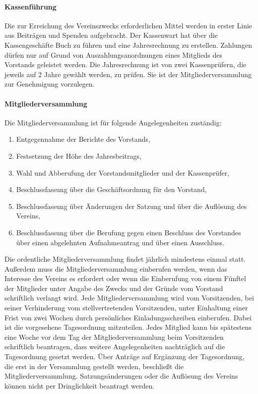 \begin{multicols}{2}
\paragraph{Kassenführung}
Die zur Erreichung des Vereinszwecks erforderlichen Mittel werden in
erster Linie aus Beiträgen und Spenden aufgebracht. Der Kassenwart hat
über die Kassengeschäfte Buch zu führen und eine Jahresrechnung zu
erstellen. Zahlungen dürfen nur auf Grund von Auszahlungsanordnungen
eines Mitglieds des Vorstands geleistet werden. Die Jahresrechnung ist von
zwei Kassenprüfern, die jeweils auf 2 Jahre gewählt werden, zu prüfen. Sie
ist der Mitgliederversammlung zur Genehmigung vorzulegen.

\paragraph{Mitgliederversammlung}
Die Mitgliederversammlung ist für folgende Angelegenheiten zuständig:
\begin{enumerate}
\item Entgegennahme der Berichte des Vorstands,
\item Festsetzung der Höhe des Jahresbeitrags,
\item Wahl und Abberufung der Vorstandsmitglieder und der Kassenprüfer,
\item Beschlussfassung über die Geschäftsordnung für den Vorstand,
\item Beschlussfassung über Änderungen der Satzung und über die Auflösung
des Vereins,
\item Beschlussfassung über die Berufung gegen einen Beschluss des
Vorstandes über einen abgelehnten Aufnahmeantrag und über einen
Ausschluss.
\end{enumerate}
Die ordentliche Mitgliederversammlung findet jährlich mindestens einmal
statt. Außerdem muss die Mitgliederversammlung einberufen werden, wenn
das Interesse des Vereins es erfordert oder wenn die Einberufung von
einem Fünftel der Mitglieder unter Angabe des Zwecks und der Gründe
vom Vorstand schriftlich verlangt wird. Jede Mitgliederversammlung wird
vom Vorsitzenden, bei seiner Verhinderung vom stellvertretenden
Vorsitzenden, unter Einhaltung einer Frist von zwei Wochen durch
persönliches Einladungsschreiben einberufen. Dabei ist die vorgesehene
Tagesordnung mitzuteilen. Jedes Mitglied kann bis spätestens eine Woche
vor dem Tag der Mitgliederversammlung beim Vorsitzenden schriftlich
beantragen, dass weitere Angelegenheiten nachträglich auf die
Tagesordnung gesetzt werden. Über Anträge auf Ergänzung der
Tagesordnung, die erst in der Versammlung gestellt werden, beschließt die
Mitgliederversammlung. Satzungsänderungen oder die Auflösung des
Vereins können nicht per Dringlichkeit beantragt werden.


\end{multicols}
